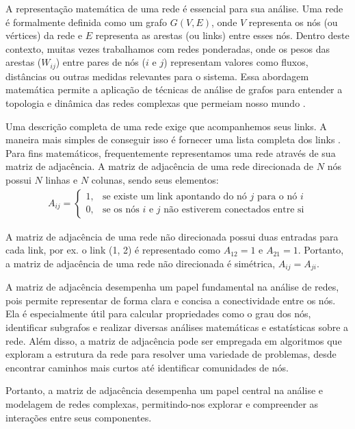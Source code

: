 A representação matemática de uma rede é essencial para sua análise. Uma rede é formalmente definida como um grafo $G(V, E)$, onde $V$ representa os nós (ou vértices) da rede e $E$ representa as arestas (ou links) entre esses nós. Dentro deste contexto, muitas vezes trabalhamos com redes ponderadas, onde os pesos das arestas ($W_{ij}$) entre pares de nós ($i$ e $j$) representam valores como fluxos, distâncias ou outras medidas relevantes para o sistema. Essa abordagem matemática permite a aplicação de técnicas de análise de grafos para entender a topologia e dinâmica das redes complexas que permeiam nosso mundo \cite{Newman2010}.

Uma descrição completa de uma rede exige que acompanhemos seus links. A maneira mais simples de conseguir isso é fornecer uma lista completa dos links \cite{barabasi2016network}. Para fins matemáticos, frequentemente representamos uma rede através de sua matriz de adjacência. A matriz de adjacência de uma rede direcionada de $N$ nós possui $N$ linhas e $N$ colunas, sendo seus elementos:
\begin{align*}
    A_{ij} =
    \begin{cases}
        1, & \text{se existe um link apontando do nó } j \text{ para o nó } i \\
        0, & \text{se os nós } i \text{ e } j \text{ não estiverem conectados entre si}
    \end{cases}
\end{align*}

A matriz de adjacência de uma rede não direcionada possui duas entradas para cada link, por ex. o link (1, 2) é representado como $A_{12} = 1$ e $A_{21} = 1$. Portanto, a matriz de adjacência de uma rede não direcionada é simétrica, $A_{ij} = A_{ji}$.

A matriz de adjacência desempenha um papel fundamental na análise de redes, pois permite representar de forma clara e concisa a conectividade entre os nós. Ela é especialmente útil para calcular propriedades como o grau dos nós, identificar subgrafos e realizar diversas análises matemáticas e estatísticas sobre a rede. Além disso, a matriz de adjacência pode ser empregada em algoritmos que exploram a estrutura da rede para resolver uma variedade de problemas, desde encontrar caminhos mais curtos até identificar comunidades de nós.

Portanto, a matriz de adjacência desempenha um papel central na análise e modelagem de redes complexas, permitindo-nos explorar e compreender as interações entre seus componentes.

